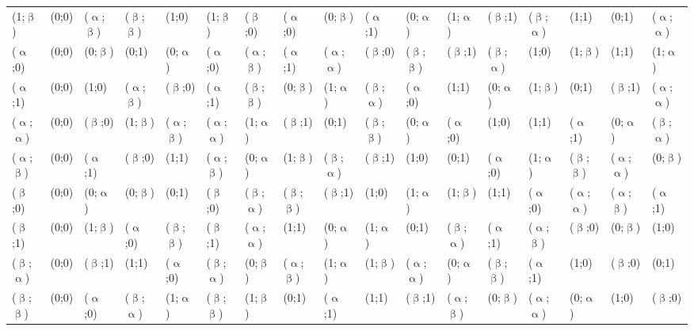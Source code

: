 \begin{table}[H]
\begin{changemargin}{-0.5cm}{-1cm}
\begin{tabular}{p{0.7cm}|p{0.5cm}p{0.5cm}p{0.5cm}p{0.5cm}p{0.5cm}p{0.5cm}p{0.5cm}p{0.5cm}p{0.5cm}p{0.5cm}p{0.5cm}p{0.5cm}p{0.5cm}p{0.5cm}p{0.5cm}p{0.5cm}}
(1;$\upbeta$) & (0;0) & ($\upalpha$;$\upbeta$) & ($\upbeta$;$\upbeta$) & (1;0) & (1;$\upbeta$) & ($\upbeta$;0) & ($\upalpha$;0) & (0;$\upbeta$) & ($\upalpha$;1) & (0;$\upalpha$) & (1;$\upalpha$) & ($\upbeta$;1) & ($\upbeta$;$\upalpha$) & (1;1) & (0;1) & ($\upalpha$;$\upalpha$) \\
($\upalpha$;0) & (0;0) & (0;$\upbeta$) & (0;1) & (0;$\upalpha$) & ($\upalpha$;0) & ($\upalpha$;$\upbeta$) & ($\upalpha$;1) & ($\upalpha$;$\upalpha$) & ($\upbeta$;0) & ($\upbeta$;$\upbeta$) & ($\upbeta$;1) & ($\upbeta$;$\upalpha$) & (1;0) & (1;$\upbeta$) & (1;1) & (1;$\upalpha$) \\
($\upalpha$;1) & (0;0) & (1;0) & ($\upalpha$;$\upbeta$) & ($\upbeta$;0) & ($\upalpha$;1) & ($\upbeta$;$\upbeta$) & (0;$\upbeta$) & (1;$\upalpha$) & ($\upbeta$;$\upalpha$) & ($\upalpha$;0) & (1;1) & (0;$\upalpha$) & (1;$\upbeta$) & (0;1) & ($\upbeta$;1) & ($\upalpha$;$\upalpha$) \\
($\upalpha$;$\upalpha$) & (0;0) & ($\upbeta$;0) & (1;$\upbeta$) & ($\upalpha$;$\upbeta$) & ($\upalpha$;$\upalpha$) & (1;$\upalpha$) & ($\upbeta$;1) & (0;1) & ($\upbeta$;$\upbeta$) & (0;$\upalpha$) & ($\upalpha$;0) & (1;0) & (1;1) & ($\upalpha$;1) & (0;$\upalpha$) & ($\upbeta$;$\upalpha$) \\
($\upalpha$;$\upbeta$) & (0;0) & ($\upalpha$;1) & ($\upbeta$;0) & (1;1) & ($\upalpha$;$\upbeta$) & (0;$\upalpha$) & (1;$\upbeta$) & ($\upbeta$;$\upalpha$) & ($\upbeta$;1) & (1;0) & (0;1) & ($\upalpha$;0) & (1;$\upalpha$) & ($\upbeta$;$\upbeta$) & ($\upalpha$;$\upalpha$) & (0;$\upbeta$) \\
($\upbeta$;0) & (0;0) & (0;$\upalpha$) & (0;$\upbeta$) & (0;1) & ($\upbeta$;0) & ($\upbeta$;$\upalpha$) & ($\upbeta$;$\upbeta$) & ($\upbeta$;1) & (1;0) & (1;$\upalpha$) & (1;$\upbeta$) & (1;1) & ($\upalpha$;0) & ($\upalpha$;$\upalpha$) & ($\upalpha$;$\upbeta$) & ($\upalpha$;1) \\
($\upbeta$;1) & (0;0) & (1;$\upbeta$) & ($\upalpha$;0) & ($\upbeta$;$\upbeta$) & ($\upbeta$;1) & ($\upalpha$;$\upalpha$) & (1;1) & (0;$\upalpha$) & (1;$\upalpha$) & (0;1) & ($\upbeta$;$\upalpha$) & ($\upalpha$;1) & ($\upalpha$;$\upbeta$) & ($\upbeta$;0) & (0;$\upbeta$) & (1;0) \\
($\upbeta$;$\upalpha$) & (0;0) & ($\upbeta$;1) & (1;1) & ($\upalpha$;0) & ($\upbeta$;$\upalpha$) & (0;$\upbeta$) & ($\upalpha$;$\upbeta$) & (1;$\upalpha$) & (1;$\upbeta$) & ($\upalpha$;$\upalpha$) & (0;$\upalpha$) & ($\upbeta$;$\upbeta$) & ($\upalpha$;1) & (1;0) & ($\upbeta$;0) & (0;1) \\
($\upbeta$;$\upbeta$) & (0;0) & ($\upalpha$;0) & ($\upbeta$;$\upalpha$) & (1;$\upalpha$) & ($\upbeta$;$\upbeta$) & (1;$\upbeta$) & (0;1) & ($\upalpha$;1) & (1;1) & ($\upbeta$;1) & ($\upalpha$;$\upbeta$) & (0;$\upbeta$) & ($\upalpha$;$\upalpha$) & (0;$\upalpha$) & (1;0) & ($\upbeta$;0)
\end{tabular}
\end{changemargin}
\end{table}
